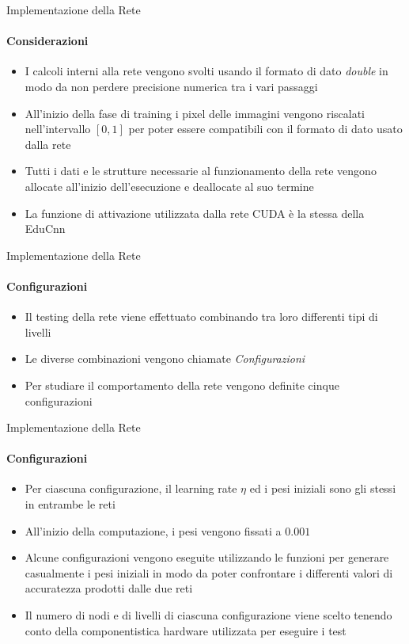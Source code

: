 \documentclass[
 ]{beamer}
\begin{document}
\begin{frame}{Implementazione della Rete}
    \framesubtitle{Considerazioni}
    \begin{itemize} [<+->]
        \setlength\itemsep{1.5em}
        \item \large I calcoli interni alla rete vengono svolti usando il formato di dato \emph{double} in modo da non perdere precisione numerica tra i vari passaggi
        \item \large All'inizio della fase di training i pixel delle immagini vengono riscalati nell'intervallo $[0,1]$ per poter essere compatibili con il formato di dato usato dalla rete 
        \item \large Tutti i dati e le strutture necessarie al funzionamento della rete vengono allocate all'inizio dell'esecuzione e deallocate al suo termine
        \item \large La funzione di attivazione utilizzata dalla rete CUDA è la stessa della EduCnn
    \end{itemize} 
    
\end{frame}

\begin{frame}{Implementazione della Rete}
    \framesubtitle{Configurazioni}
    \smallskip
    \begin{itemize} [<+->]
        \setlength\itemsep{2em}
        \item \large Il testing della rete viene effettuato combinando tra loro differenti tipi di livelli
        \item \large Le diverse combinazioni vengono chiamate \emph{Configurazioni}
        \item \large Per studiare il comportamento della rete vengono definite cinque configurazioni
    \end{itemize}     
\end{frame}

\begin{frame}{Implementazione della Rete}
    \framesubtitle{Configurazioni}
    \smallskip
    \begin{itemize} [<+->]
        \setlength\itemsep{2em}
        \item \large Per ciascuna configurazione, il learning rate $\eta$ ed i pesi iniziali sono gli stessi in entrambe le reti
        \item \large All'inizio della computazione, i pesi vengono fissati a $0.001$ 
        \item \large Alcune configurazioni vengono eseguite utilizzando le funzioni per generare casualmente i pesi iniziali in modo da poter confrontare i differenti valori di accuratezza prodotti dalle due reti
        \item \large Il numero di nodi e di livelli di ciascuna configurazione viene scelto tenendo conto della componentistica hardware utilizzata per eseguire i test
    \end{itemize}     
\end{frame}
\end{document}
